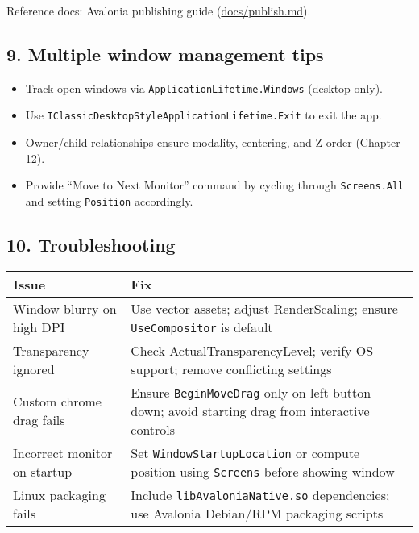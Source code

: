Reference docs: Avalonia publishing guide
(\href{https://github.com/AvaloniaUI/Avalonia/blob/master/docs/publish.md}{docs/publish.md}).

\subsection{9. Multiple window management
tips}\label{multiple-window-management-tips}

\begin{itemize}
\tightlist
\item
  Track open windows via
  \passthrough{\lstinline!ApplicationLifetime.Windows!} (desktop only).
\item
  Use
  \passthrough{\lstinline!IClassicDesktopStyleApplicationLifetime.Exit!}
  to exit the app.
\item
  Owner/child relationships ensure modality, centering, and Z-order
  (Chapter 12).
\item
  Provide ``Move to Next Monitor'' command by cycling through
  \passthrough{\lstinline!Screens.All!} and setting
  \passthrough{\lstinline!Position!} accordingly.
\end{itemize}

\subsection{10. Troubleshooting}\label{troubleshooting-2}

\begin{longtable}[]{@{}
  >{\raggedright\arraybackslash}p{}
  >{\raggedright\arraybackslash}p{}@{}}
\toprule\noalign{}
\begin{minipage}[b]{\linewidth}\raggedright
Issue
\end{minipage} & \begin{minipage}[b]{\linewidth}\raggedright
Fix
\end{minipage} \\
\midrule\noalign{}
\endhead
\bottomrule\noalign{}
\endlastfoot
Window blurry on high DPI & Use vector assets; adjust RenderScaling;
ensure \passthrough{\lstinline!UseCompositor!} is default \\
Transparency ignored & Check ActualTransparencyLevel; verify OS support;
remove conflicting settings \\
Custom chrome drag fails & Ensure
\passthrough{\lstinline!BeginMoveDrag!} only on left button down; avoid
starting drag from interactive controls \\
Incorrect monitor on startup & Set
\passthrough{\lstinline!WindowStartupLocation!} or compute position
using \passthrough{\lstinline!Screens!} before showing window \\
Linux packaging fails & Include
\passthrough{\lstinline!libAvaloniaNative.so!} dependencies; use
Avalonia Debian/RPM packaging scripts \\
\end{longtable}

